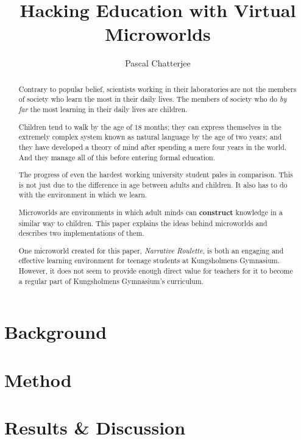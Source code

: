 \documentclass[a4paper]{report}
\title{Hacking Education with Virtual Microworlds}
\author{Pascal Chatterjee}
\date{\parbox{\linewidth}{\centering%
  \today\endgraf\bigskip
  KTH Department of Computer Science (CSC) \endgraf
  Thesis supervisor: Linda Kann}}
\begin{document}
\maketitle

\begin{abstract}
Contrary to popular belief, scientists working in their laboratories are not the members of society who learn the most in their daily lives. The members of society who do \textit{by far} the most learning in their daily lives are children. 

Children tend to walk by the age of 18 months; they can express themselves in the extremely complex system known as natural language by the age of two years; and they have developed a theory of mind after spending a mere four years in the world. And they manage all of this before entering formal education.

The progress of even the hardest working university student pales in comparison. This is not just due to the difference in age between adults and children. It also has to do with the environment in which we learn.

Microworlds are environments in which adult minds can \textbf{construct} knowledge in a similar way to children. This paper explains the ideas behind microworlds and describes two implementations of them. 

One microworld created for this paper, \textit{Narrative Roulette}, is both an engaging and effective learning environment for teenage students at Kungsholmens Gymnasium. However, it does not seem to provide enough direct value for teachers for it to become a regular part of Kungsholmens Gymnasium's curriculum.
\end{abstract}

\tableofcontents



\chapter{Background}







\chapter{Method}






\chapter{Results \& Discussion}







\end{document}
